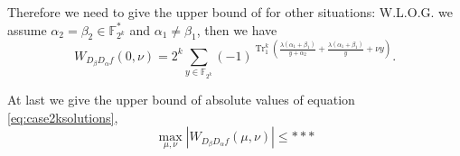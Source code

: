 \documentclass{article}
\newcommand{\F}{\mathbb{F}}
\newcommand{\TRACE}{\operatorname{Tr}_1^k}
\theoremstyle{nonumberplain}
\newcommand{\0}{\textbf{0}}
\newcommand{\1}{\textbf{1}}
\begin{document}
    Therefore we need to give the upper bound of for other situations: W.L.O.G. we assume 
    $ \alpha_2=\beta_2\in\F_{2^k}^* $ and $ \alpha_1\ne\beta_1 $, then we have 
    \[ W_{D_{\beta}D_{\alpha}f}(0,\nu)=2^k\sum_{y\in\F_{2^k}}(-1)^{\TRACE\left(\frac{\lambda(\alpha_1+\beta_1)}{y+\alpha_2}+\frac{\lambda(\alpha_1+\beta_1)}{y}+\nu y\right)}.\]

    At last we give the upper bound of absolute values of equation \eqref{eq:case2ksolutions}, 
    \[\max_{\mu,\nu}|W_{D_{\beta}D_{\alpha}f}(\mu,\nu)|\le ***\]

    






\end{document}
